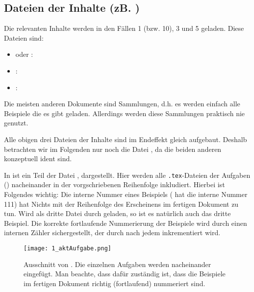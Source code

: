 \subsection{Dateien der Inhalte (zB. )}

Die relevanten Inhalte werden in den Fällen 1 (bzw. 10), 3 und 5 geladen.
Diese Dateien sind:

\begin {itemize}
 \item {} oder : 
 \item {}: 
 \item {}: 
\end{itemize}

Die meisten anderen Dokumente sind \glqq{}Sammlungen\grqq{}, d.h. es werden
einfach alle Beispiele die es gibt geladen. Allerdings werden diese Sammlungen
praktisch nie genutzt.

Alle obigen drei Dateien der Inhalte sind im Endeffekt gleich aufgebaut. 
Deshalb betrachten wir im Folgenden nur noch die Datei 
, da die beiden anderen konzeptuell ident sind.

In  ist ein Teil der Datei ,
dargestellt. Hier werden alle {\tt .tex}-Dateien der Aufgaben 
() nacheinander in der vorgschriebenen Reihenfolge 
inkludiert. Hierbei ist Folgendes wichtig: Die \glqq{}interne\grqq{} Nummer 
eines Beispiels ( hat die interne Nummer 111) 
hat Nichts mit der Reihenfolge des Erscheinens im fertigen Dokument zu tun. 
Wird  als dritte Datei durch 
 geladen, so ist es natürlich auch das dritte 
Beispiel. Die korrekte fortlaufende Nummerierung der Beispiele wird durch einen
internen Zähler sichergestellt, der durch 
nach jedem  inkrementiert wird.

\begin{figure}[htbp]
  \texttt{[image: 1\_aktAufgabe.png]}
  \caption{Ausschnitt von . Die einzelnen
    Aufgaben werden nacheinander eingefügt. Man beachte, dass 
     dafür zuständig ist, dass die Beispiele
    im fertigen Dokument richtig (fortlaufend) nummeriert sind.}
  \label{fig:aktaufgabe}
\end{figure}

